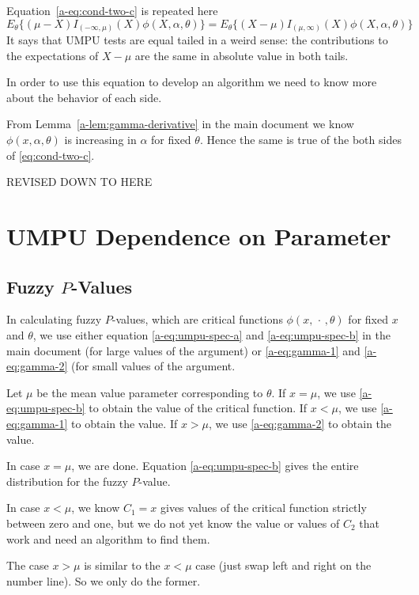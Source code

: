 \documentclass[11pt]{article}
\newcommand{\fatdot}{\,\cdot\,}
\newcommand{\REVISED}{\begin{center} \LARGE REVISED DOWN TO HERE \end{center}}
\begin{document}
Equation~\eqref{a-eq:cond-two-c} is repeated here
\begin{equation} \label{eq:cond-two-c}
   E_\theta\{ (\mu - X) I_{(- \infty, \mu)}(X) \phi(X, \alpha, \theta) \}
   =
   E_\theta\{ (X - \mu) I_{(\mu, \infty)}(X) \phi(X, \alpha, \theta) \}
\end{equation}
It says that UMPU tests are equal tailed in a weird sense: the contributions
to the expectations of $X - \mu$ are the same in absolute value in both tails.

In order to use this equation to develop an algorithm we need to know more
about the behavior of each side.

From Lemma~\ref{a-lem:gamma-derivative} in the main document we know
$\phi(x, \alpha, \theta)$ is increasing in $\alpha$ for fixed $\theta$.
Hence the same is true of the both sides of \eqref{eq:cond-two-c}.

\REVISED


\section{UMPU Dependence on Parameter}

\subsection[Fuzzy P-Values]{Fuzzy $P$-Values}

In calculating fuzzy $P$-values, which are critical functions
$\phi(x, \fatdot, \theta)$ for fixed $x$ and $\theta$,
we use either equation \eqref{a-eq:umpu-spec-a} and \eqref{a-eq:umpu-spec-b}
in the main document (for large values of the argument) or
\eqref{a-eq:gamma-1} and \eqref{a-eq:gamma-2} (for small values of the
argument.

Let $\mu$ be the mean value parameter corresponding to $\theta$.
If $x = \mu$, we use \eqref{a-eq:umpu-spec-b} to obtain the value
of the critical function.
If $x < \mu$, we use \eqref{a-eq:gamma-1} to obtain the value.
If $x > \mu$, we use \eqref{a-eq:gamma-2} to obtain the value.

In case $x = \mu$, we are done.  Equation \eqref{a-eq:umpu-spec-b} gives
the entire distribution for the fuzzy $P$-value.

In case $x < \mu$, we know $C_1 = x$ gives values of the critical function
strictly between zero and one, but we do not yet know the value or values
of $C_2$ that work and need an algorithm to find them.

The case $x > \mu$ is similar to the $x < \mu$ case (just swap left and
right on the number line).  So we only do the former.
\end{document}
